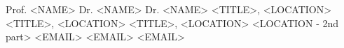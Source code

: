 

\begin{cvparagraph}

Prof. <NAME>  \hfill  Dr. <NAME>  \hfill   Dr. <NAME> \newline
<TITLE>, <LOCATION> \hfill  \hspace{0.5cm} <TITLE>, <LOCATION>   \hfill <TITLE>, <LOCATION> \newline
<LOCATION - 2nd part> 	\hfill	 <LOCATION - 2nd part>	\hspace{0.5cm} \hfill	<LOCATION - 2nd part> \newline
<EMAIL>	\hfill	<EMAIL>	\hfill		<EMAIL> \newline
\end{cvparagraph}